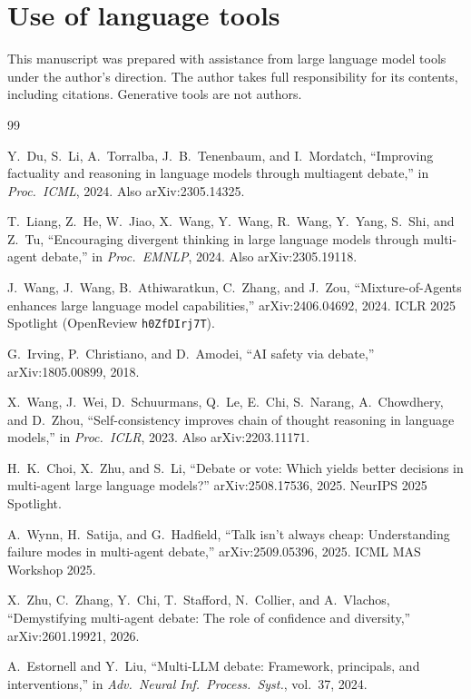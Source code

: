 \documentclass[11pt]{article}
\begin{document}
\section*{Use of language tools}

This manuscript was prepared with assistance from large language model
tools under the author's direction. The author takes full
responsibility for its contents, including citations. Generative tools
are not authors.

\begin{thebibliography}{99}

Y.~Du, S.~Li, A.~Torralba, J.~B.~Tenenbaum, and I.~Mordatch,
``Improving factuality and reasoning in language models through multiagent debate,''
in \emph{Proc.\ ICML}, 2024.
Also arXiv:2305.14325.

T.~Liang, Z.~He, W.~Jiao, X.~Wang, Y.~Wang, R.~Wang, Y.~Yang, S.~Shi, and Z.~Tu,
``Encouraging divergent thinking in large language models through multi-agent debate,''
in \emph{Proc.\ EMNLP}, 2024.
Also arXiv:2305.19118.

J.~Wang, J.~Wang, B.~Athiwaratkun, C.~Zhang, and J.~Zou,
``Mixture-of-Agents enhances large language model capabilities,''
arXiv:2406.04692, 2024.
ICLR 2025 Spotlight (OpenReview \texttt{h0ZfDIrj7T}).

G.~Irving, P.~Christiano, and D.~Amodei,
``AI safety via debate,''
arXiv:1805.00899, 2018.

X.~Wang, J.~Wei, D.~Schuurmans, Q.~Le, E.~Chi, S.~Narang, A.~Chowdhery, and D.~Zhou,
``Self-consistency improves chain of thought reasoning in language models,''
in \emph{Proc.\ ICLR}, 2023.
Also arXiv:2203.11171.

H.~K.~Choi, X.~Zhu, and S.~Li,
``Debate or vote: Which yields better decisions in multi-agent large language models?''
arXiv:2508.17536, 2025. NeurIPS 2025 Spotlight.

A.~Wynn, H.~Satija, and G.~Hadfield,
``Talk isn't always cheap: Understanding failure modes in multi-agent debate,''
arXiv:2509.05396, 2025. ICML MAS Workshop 2025.

X.~Zhu, C.~Zhang, Y.~Chi, T.~Stafford, N.~Collier, and A.~Vlachos,
``Demystifying multi-agent debate: The role of confidence and diversity,''
arXiv:2601.19921, 2026.

A.~Estornell and Y.~Liu,
``Multi-LLM debate: Framework, principals, and interventions,''
in \emph{Adv.\ Neural Inf.\ Process.\ Syst.}, vol.~37, 2024.


\end{thebibliography}
\end{document}
